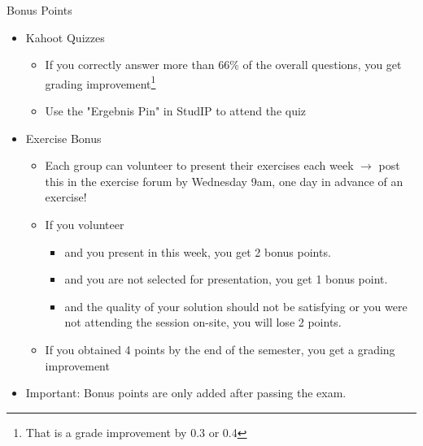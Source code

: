 \documentclass[aspectratio=169,handout]{../latex_main/tntbeamer}  %
\begin{document}
\begin{frame}[c]{Bonus Points}

\begin{itemize}
    \item Kahoot Quizzes
    \begin{itemize}
        \item If you correctly answer more than 66\% of the overall questions, you get grading improvement\footnote{That is a grade improvement by 0.3 or 0.4}
        \item Use the "Ergebnis Pin" in StudIP to attend the quiz
    \end{itemize}
    \item Exercise Bonus
    \begin{itemize}
        \item Each group can volunteer to present their exercises each week $\to$ post this in the exercise forum by \alert{Wednesday 9am}, one day in advance of an exercise!
        \item If you volunteer\begin{itemize}
            \item and you present in this week, you get 2 bonus points.
            \item and you are not selected for presentation, you get 1 bonus point.
            \item and the quality of your solution should not be satisfying or you were not attending the session on-site, you will lose 2 points.
        \end{itemize}
        \item If you obtained 4 points by the end of the semester, you get a grading improvement
    \end{itemize}
    \item \alert{Important:} Bonus points are only added \alert{after passing} the exam.
\end{itemize}

\end{frame}
\end{document}
